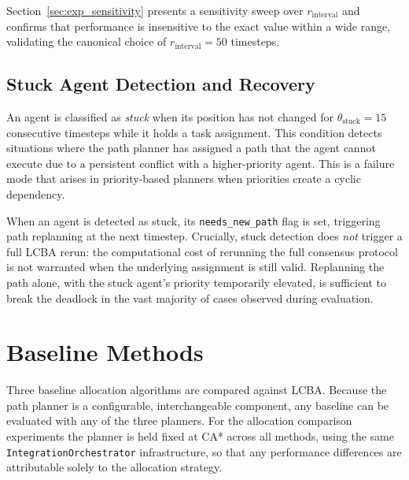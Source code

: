 Section~\ref{sec:exp_sensitivity} presents a sensitivity sweep over
$r_{\text{interval}}$ and confirms that performance is insensitive to the
exact value within a wide range, validating the canonical choice of
$r_{\text{interval}} = 50$ timesteps.


\subsection{Stuck Agent Detection and Recovery}
\label{subsec:method_stuck}

An agent is classified as \emph{stuck} when its position has not changed for
$\theta_{\text{stuck}} = 15$ consecutive timesteps while it holds a task
assignment.
This condition detects situations where the path planner has assigned a path
that the agent cannot execute due to a persistent conflict with a
higher-priority agent. This is a failure mode that arises in priority-based planners
when priorities create a cyclic dependency.

When an agent is detected as stuck, its \texttt{needs\_new\_path} flag is set,
triggering path replanning at the next timestep.
Crucially, stuck detection does \emph{not} trigger a full LCBA rerun: the
computational cost of rerunning the full consensus protocol is not warranted
when the underlying assignment is still valid.
Replanning the path alone, with the stuck agent's priority temporarily elevated,
is sufficient to break the deadlock in the vast majority of cases observed
during evaluation.


\section{Baseline Methods}
\label{sec:method_baselines}

Three baseline allocation algorithms are compared against LCBA.
Because the path planner is a configurable, interchangeable component, any
baseline can be evaluated with any of the three planners.
For the allocation comparison experiments the planner is held fixed at CA*
across all methods, using the same \texttt{IntegrationOrchestrator}
infrastructure, so that any performance differences are attributable solely to
the allocation strategy.

